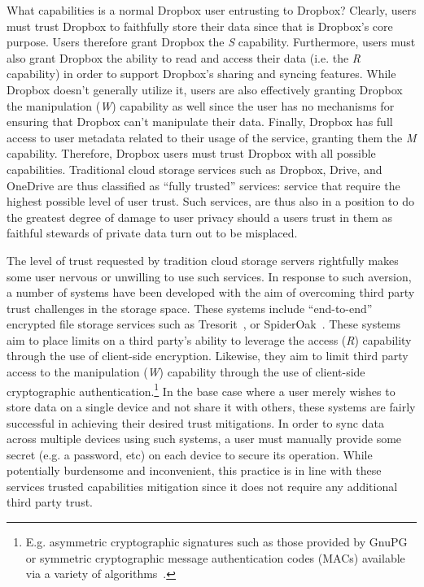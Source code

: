What capabilities is a normal Dropbox user entrusting to Dropbox?
Clearly, users must trust Dropbox to faithfully store their data since
that is Dropbox's core purpose. Users therefore grant Dropbox the
\emph{S} capability. Furthermore, users must also grant Dropbox the
ability to read and access their data (i.e. the \emph{R} capability)
in order to support Dropbox's sharing and syncing features. While
Dropbox doesn't generally utilize it, users are also effectively
granting Dropbox the manipulation (\emph{W}) capability as well since
the user has no mechanisms for ensuring that Dropbox can't manipulate
their data. Finally, Dropbox has full access to user metadata related
to their usage of the service, granting them the \emph{M}
capability. Therefore, Dropbox users must trust Dropbox with all
possible capabilities. Traditional cloud storage services such as
Dropbox, Drive, and OneDrive are thus classified as ``fully trusted''
services: service that require the highest possible level of user
trust. Such services, are thus also in a position to do the greatest
degree of damage to user privacy should a users trust in them as
faithful stewards of private data turn out to be misplaced.

The level of trust requested by tradition cloud storage servers
rightfully makes some user nervous or unwilling to use such
services. In response to such aversion, a number of systems have been
developed with the aim of overcoming third party trust challenges in
the storage space. These systems include ``end-to-end'' encrypted file
storage services such as Tresorit~\cite{tresorit}, or
SpiderOak~\cite{spideroak}. These systems aim to place limits on a
third party's ability to leverage the access (\emph{R}) capability
through the use of client-side encryption. Likewise, they aim to limit
third party access to the manipulation (\emph{W}) capability through
the use of client-side cryptographic
authentication.\footnote{E.g. asymmetric cryptographic signatures such
  as those provided by GnuPG~\cite{gnupg} or symmetric cryptographic
  message authentication codes (MACs) available via a variety of
  algorithms~\cite{dworkin2005, dworkin2007, dworkin2008}.}  In the
base case where a user merely wishes to store data on a single device
and not share it with others, these systems are fairly successful in
achieving their desired trust mitigations. In order to sync data
across multiple devices using such systems, a user must manually
provide some secret (e.g. a password, etc) on each device to secure
its operation. While potentially burdensome and inconvenient, this
practice is in line with these services trusted capabilities
mitigation since it does not require any additional third party trust.

